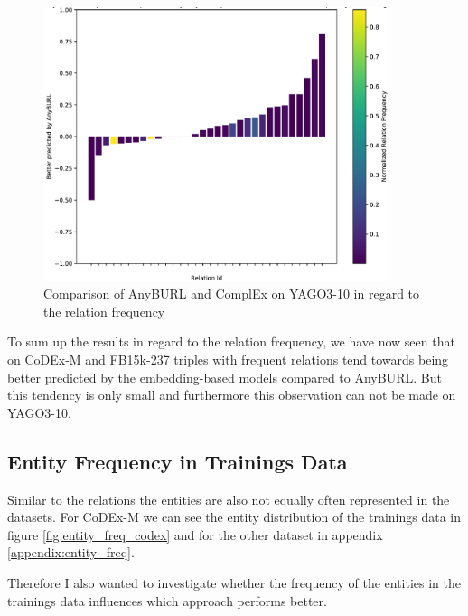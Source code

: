 \begin{figure}[H]
\centering
\includegraphics[width=0.9\textwidth]{images/relation_freq_anyburl_complex_yago.PNG}
\caption{Comparison of AnyBURL and ComplEx on YAGO3-10 in regard to the relation frequency}
\label{fig:relation_freq_anyburl_complex_yago}
\end{figure}

To sum up the results in regard to the relation frequency, we have now seen that on CoDEx-M and FB15k-237 triples with frequent relations tend towards being better predicted by the embedding-based models compared to AnyBURL. But this tendency is only small and furthermore this observation can not be made on YAGO3-10.

\subsection{Entity Frequency in Trainings Data}
Similar to the relations the entities are also not equally often represented in the datasets. For CoDEx-M we can see the entity distribution of the trainings data in figure \ref{fig:entity_freq_codex} and for the other dataset in appendix \ref{appendix:entity_freq}. 

Therefore I also wanted to investigate whether the frequency of the entities in the trainings data influences which approach performs better. 

